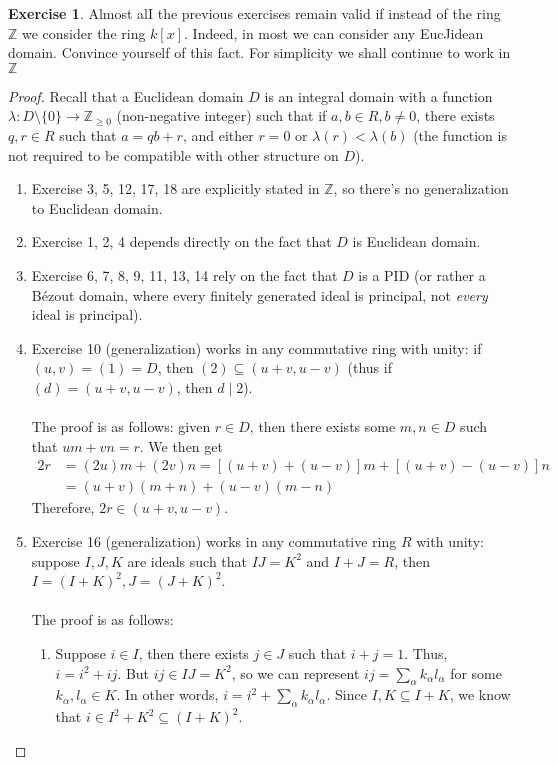 \documentclass{article}
\theoremstyle{definition}
\newtheorem{exercise}{Exercise}
\begin{document}
\begin{exercise}
Almost alI the previous exercises remain valid if instead of the ring $\mathbb{Z}$ we consider the ring $k[x]$. Indeed, in most we can consider any EucJidean domain. Convince yourself of this fact. For simplicity we shall continue to work in $\mathbb{Z}$
\end{exercise}
\begin{proof}
Recall that a Euclidean domain $D$ is an integral domain with a function $\lambda: D \setminus \{ 0 \} \to \mathbb{Z}_{\geq 0}$ (non-negative integer) such that if $a, b \in R, b \neq 0$, there exists $q, r \in R$ such that $a = qb + r$, and either $r = 0$ or $\lambda(r) < \lambda(b)$ (the function is not required to be compatible with other structure on $D$).
\begin{enumerate}
	\item Exercise 3, 5, 12, 17, 18 are explicitly stated in $\mathbb{Z}$, so there's no generalization to Euclidean domain.
	\item Exercise 1, 2, 4 depends directly on the fact that $D$ is Euclidean domain.
	\item Exercise 6, 7, 8, 9, 11, 13, 14 rely on the fact that $D$ is a PID (or rather a Bézout domain, where every finitely generated ideal is principal, not \emph{every} ideal is principal).
	\item Exercise 10 (generalization) works in any commutative ring with unity: if $(u, v) = (1) = D$, then $(2) \subseteq (u + v, u - v)$ (thus if $(d) = (u + v, u - v)$, then $d \mid 2$).
	\\
	\\
	The proof is as follows: given $r \in D$, then there exists some $m, n \in D$ such that $um + vn = r$. We then get
	\begin{align*}
	2r & = (2u) m + (2v) n = [(u + v) + (u - v)] m + [(u + v) - (u - v)] n \\
	& = (u + v) (m + n) + (u - v) (m - n)
	\end{align*}
	Therefore, $2r \in (u + v, u - v)$.
	\item Exercise 16 (generalization) works in any commutative ring $R$ with unity: suppose $I, J, K$ are ideals such that $IJ = K^2$ and $I + J = R$, then $I = (I + K)^2, J = (J + K)^2$.
	\\
	\\
	The proof is as follows:
	\begin{enumerate}
		\item Suppose $i \in I$, then there exists $j \in J$ such that $i + j = 1$. Thus, $i = i^2 + ij$. But $ij \in IJ = K^2$, so we can represent $ij = \sum_\alpha k_\alpha l_\alpha$ for some $k_\alpha, l_\alpha \in K$. In other words, $i = i^2 + \sum_\alpha k_\alpha l_\alpha$. Since $I, K \subseteq I + K$, we know that $i \in I^2 + K^2 \subseteq (I + K)^2$.

\end{enumerate}
\end{enumerate}
\end{proof}
\end{document}
